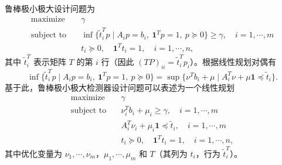 \documentclass[UTF8,12pt,a4paper,fontset=fandol]{ctexart}
\begin{document}
鲁棒极小极大设计问题为
\[
\begin{aligned}
\text{maximize}\quad & \gamma\\
\text{subject to}\quad & \inf\{\tilde{t}_i^Tp\mid A_ip=b_i,\ \mathbf{1}^Tp=1,\ p\succeq 0\}\geq \gamma,\quad i=1,\cdots,m\\
& t_i\succeq 0,\quad \mathbf{1}^Tt_i=1,\quad i=1,\cdots,n,
\end{aligned}
\]
其中 $\tilde{t}_i^T$ 表示矩阵 $T$ 的第 $i$ 行（因此 $(TP)_{ii}=\tilde{t}_i^Tp_i$）。根据线性规划对偶有
\[
\inf\{\tilde{t}_i^Tp\mid A_ip=b_i,\ \mathbf{1}^Tp=1,\ p\succeq 0\}
=\sup\{\nu^Tb_i+\mu\mid A_i^T\nu+\mu\mathbf{1}\preceq \tilde{t}_i\}.
\]
基于此，鲁棒极小极大检测器设计问题可以表述为一个线性规划
\[
\begin{aligned}
\text{maximize}\quad & \gamma\\
\text{subject to}\quad & \nu_i^Tb_i+\mu_i\geq \gamma,\quad i=1,\cdots,m\\
& A_i^T\nu_i+\mu_i\mathbf{1}\preceq \tilde{t}_i,\quad i=1,\cdots,m\\
& t_i\succeq 0,\quad \mathbf{1}^Tt_i=1,\quad i=1,\cdots,n,
\end{aligned}
\]
其中优化变量为 $\nu_1,\cdots,\nu_m$，$\mu_1,\cdots,\mu_m$ 和 $T$（其列为 $t_i$，行为 $\tilde{t}_i^T$）。
\end{document}
